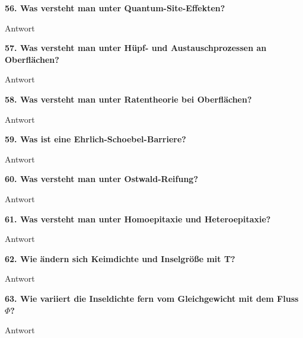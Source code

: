 \noindent\textbf{56. Was versteht man unter Quantum-Site-Effekten?}\\
\begin{addmargin}[25pt]{0pt}
Antwort\\
\end{addmargin}

\noindent\textbf{57. Was versteht man unter Hüpf- und Austauschprozessen an Oberflächen?}\\
\begin{addmargin}[25pt]{0pt}
Antwort\\
\end{addmargin}

\noindent\textbf{58. Was versteht man unter Ratentheorie bei Oberflächen?}\\
\begin{addmargin}[25pt]{0pt}
Antwort\\
\end{addmargin}

\noindent\textbf{59. Was ist eine Ehrlich-Schoebel-Barriere?}\\
\begin{addmargin}[25pt]{0pt}
Antwort\\
\end{addmargin}

\noindent\textbf{60. Was versteht man unter Ostwald-Reifung?}\\
\begin{addmargin}[25pt]{0pt}
Antwort\\
\end{addmargin}

\noindent\textbf{61. Was versteht man unter Homoepitaxie und Heteroepitaxie?}\\
\begin{addmargin}[25pt]{0pt}
Antwort\\
\end{addmargin}

\noindent\textbf{62. Wie ändern sich Keimdichte und Inselgröße mit T?}\\
\begin{addmargin}[25pt]{0pt}
Antwort\\
\end{addmargin}

\noindent\textbf{63.  Wie variiert die Inseldichte fern vom Gleichgewicht mit dem Fluss $\Phi$?}\\
\begin{addmargin}[25pt]{0pt}
Antwort\\
\end{addmargin}

